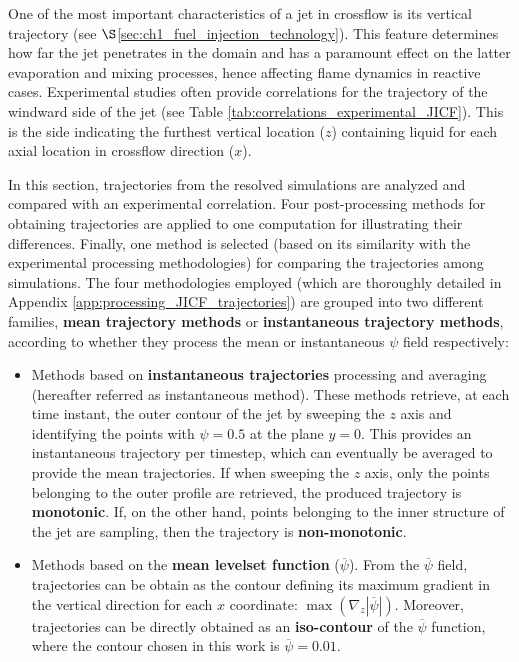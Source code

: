 One of the most important characteristics of a jet in crossflow is its vertical trajectory (see $\S$\ref{sec:ch1_fuel_injection_technology}). This feature determines how far the jet penetrates in the domain and has a paramount effect on the latter evaporation and mixing processes, hence affecting flame dynamics in reactive cases. Experimental studies often provide correlations for the trajectory of the windward side of the jet (see Table \ref{tab:correlations_experimental_JICF}). This is the side indicating the furthest vertical location ($z$) containing liquid for each axial location in crossflow direction ($x$). %

In this section, trajectories from the resolved simulations are analyzed and compared with an experimental correlation. Four post-processing methods for obtaining trajectories are applied to one computation for illustrating their differences. Finally, one method is selected (based on its similarity with the experimental processing methodologies) for comparing the trajectories among simulations. The four methodologies employed (which are thoroughly detailed in Appendix \ref{app:processing_JICF_trajectories}) are grouped into two different families, \textbf{mean trajectory methods} or \textbf{instantaneous trajectory methods}, according to whether they process the mean or instantaneous $\psi$ field respectively:

\begin{itemize}

	\item Methods based on \textbf{instantaneous trajectories} processing and averaging (hereafter referred as instantaneous method). These methods retrieve, at each time instant, the outer contour of the jet by sweeping the $z$ axis and identifying the points with $\psi = 0.5$ at the plane $y = 0$. This provides an instantaneous trajectory per timestep, which can eventually be averaged to provide the mean trajectories. If when sweeping the $z$ axis, only the points belonging to the outer profile are retrieved, the produced trajectory is \textbf{monotonic}. If, on the other hand, points belonging to the inner structure of the jet are sampling, then the trajectory is \textbf{non-monotonic}.
	
	\item Methods based on the \textbf{mean levelset function} ($\overline{\psi}$). From the $\overline{\psi}$ field, trajectories can be obtain as the contour defining its maximum gradient in the vertical direction for each $x$ coordinate: $\max \left( \nabla_z | \overline{\psi} | \right)$. Moreover, trajectories can be directly obtained as an \textbf{iso-contour} of the $\overline{\psi}$ function, where the contour chosen in this work is $\overline{\psi} = 0.01$.

\end{itemize}

